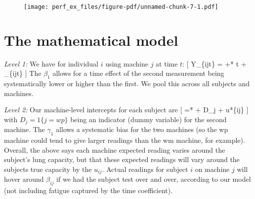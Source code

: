 \documentclass[
  letterpaper,
  DIV=11,
  numbers=noendperiod]{scrreprt}
\newenvironment{Shaded}{\begin{snugshade}}{\end{snugshade}}
\newcommand{\AttributeTok}[1]{\textcolor[rgb]{0.49,0.56,0.16}{#1}}
\newcommand{\DecValTok}[1]{\textcolor[rgb]{0.25,0.63,0.44}{#1}}
\newcommand{\FloatTok}[1]{\textcolor[rgb]{0.25,0.63,0.44}{#1}}
\newcommand{\FunctionTok}[1]{\textcolor[rgb]{0.02,0.16,0.49}{#1}}
\newcommand{\NormalTok}[1]{\textcolor[rgb]{0.00,0.44,0.13}{#1}}
\newcommand{\OtherTok}[1]{\textcolor[rgb]{0.00,0.44,0.13}{#1}}
\newcommand{\SpecialCharTok}[1]{\textcolor[rgb]{0.25,0.44,0.63}{#1}}
\begin{document}
\begin{Shaded}
\end{Shaded}

\begin{figure}[H]

{\centering \texttt{[image: perf\_ex\_files/figure-pdf/unnamed-chunk-7-1.pdf]}

}

\end{figure}

\hypertarget{the-mathematical-model-1}{%
\section{The mathematical model}\label{the-mathematical-model-1}}

\emph{Level 1:} We have for individual \(i\) using machine \(j\) at time
\(t\): {[} Y\_\{ijt\} =  +*  t + \epsilon\_\{ijt\}
{]} The \(\beta_{1}\) allows for a time effect of the second measurement
being systematically lower or higher than the first. We pool this across
all subjects and machines.

\emph{Level 2:} Our machine-level intercepts for each subject are {[}
 =*  +  D\_j + u*\{ij\} {]} with
\(D_j = 1\{ j = wp \}\) being an indicator (dummy variable) for the
second machine. The \(\gamma_1\) allows a systematic bias for the two
machines (so the wp machine could tend to give larger readings than the
wm machine, for example). Overall, the above says each machine expected
reading varies around the subject's lung capacity, but that these
expected readings will vary around the subjects true capacity by the
\(u_{ij}\). Actual readings for subject \(i\) on machine \(j\) will
hover around \(\beta_{ij}\) if we had the subject test over and over,
according to our model (not including fatigue captured by the time
coefficient).
\end{document}

